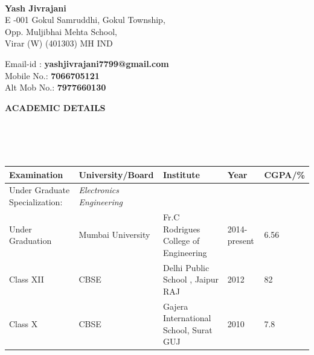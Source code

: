 \documentclass[a4paper,10pt]{article}
\newcommand{\lsep}{-0.5cm}
\newcommand{\resheading}[1]{{\small \colorbox{mygrey}{\begin{minipage}{0.975\textwidth}{\textbf{#1 \vphantom{p\^{E}}}}\end{minipage}}}}
\begin{document}
\hspace{0.5cm}\\[-0.2cm]



\textbf{Yash Jivrajani} \\
\indent E -001 Gokul Samruddhi, Gokul Township, \\
\indent Opp. Muljibhai Mehta School,  \\
\indent Virar (W) (401303) MH IND

\indent Email-id : \textbf{yashjivrajani7799@gmail.com} \\
\indent Mobile No.: \textbf{7066705121} \\
\indent Alt Mob No.: \textbf{7977660130} \\
\hspace*{14cm} 

\indent{}
\resheading{\textbf{ACADEMIC DETAILS} }\\[\lsep]
\\ \\
\begin{table}[ht!]
\begin{center}
\indent \begin{tabular}{ l @{\hskip 0.1in} l @{\hskip 0.1in} l @{\hskip 0.1in} l @{\hskip 0.1in} l }
\hline
\textbf{Examination} & \textbf{University/Board} & \textbf{Institute} & \textbf{Year} & \textbf{CGPA/\%} \\
\hline
Under Graduate Specialization:\,\, & \textit{Electronics Engineering} \\
Under Graduation & Mumbai University & Fr.C Rodrigues College of Engineering & 2014-present & 6.56 \\
Class XII & CBSE & Delhi Public School , Jaipur RAJ & 2012 & 82\\
Class X & CBSE & Gajera International School, Surat GUJ & 2010 & 7.8\\
\hline
\end{tabular}
\end{center}
\end{table}
\\ \\
\end{document}
